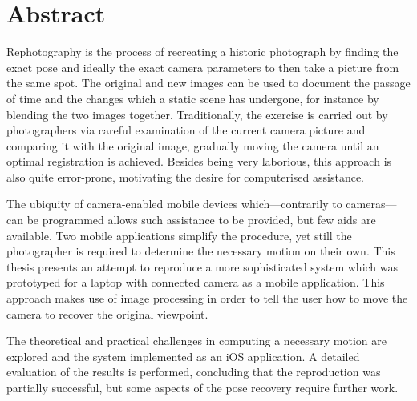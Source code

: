 \chapter*{Abstract}

Rephotography is the process of recreating a historic photograph by finding the
exact pose and ideally the exact camera parameters to then take a picture from
the same spot. The original and new images
can be used to document the passage of time and the changes which a static scene
has undergone, for instance by blending the two images together. Traditionally,
the exercise is carried out by photographers via careful examination of the
current camera picture and comparing it with the original image, gradually
moving the camera until an optimal registration is achieved. Besides being very
laborious, this approach is also quite error-prone, motivating the desire for
computerised assistance.

The ubiquity of camera-enabled mobile devices which---contrarily to
cameras---can be programmed allows such assistance to be provided, but few aids
are available. Two mobile applications simplify the procedure, yet still the
photographer is required to determine the necessary motion on their own. This
thesis presents an attempt to reproduce a more sophisticated system which was
prototyped for a laptop with connected camera as a mobile application. This
approach makes use of image processing in order to tell the user how to move the
camera to recover the original viewpoint.

The theoretical and practical challenges in computing a necessary motion are
explored and the system implemented as an iOS application. A detailed
evaluation of the results is performed, concluding that the reproduction was
partially successful, but some aspects of the pose recovery require further work.
